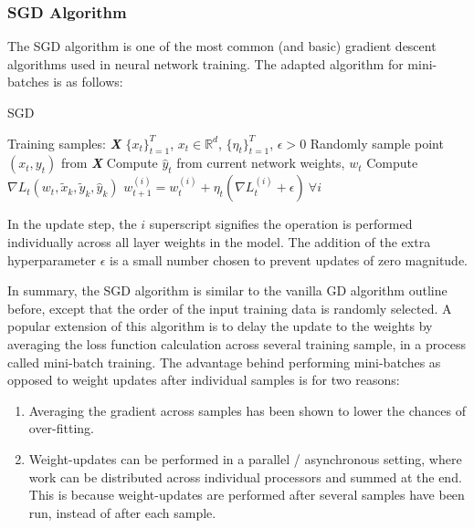 \subsubsection{SGD Algorithm}
The SGD algorithm is one of the most common (and basic) gradient descent algorithms used in neural network training. The adapted algorithm for mini-batches is as follows:
\vspace{14pt}
\begin{minipage}[b]{.48\textwidth}
\begin{algorithm}[H]\small
	\caption{SGD \cite{SGD}}
	\label{alg:SGD}
	\begin{algorithmic}
		 Training samples: \textbf{\textit{X}} \subset $\{x_t\}_{t=1}^T$, $x_t \in \mathbb{R}^d$, $\{\eta_t\}_{t=1}^T$, $\epsilon>0$
		\vspace{4pt}
		    \vspace{3pt}
		    \STATE Randomly sample point $(x_t,y_t)$ from \textbf{\textit{X}}
		    \vspace{3pt}
		    \STATE Compute $\hat y_t$ from current network weights, $w_t$
		    \vspace{3pt}
		    \STATE Compute $\nabla L_t(w_t,\tilde x_{k},\tilde y_k,\hat y_k)$
		    \vspace{3pt}
		    \STATE $w_{t+1}^{(i)} = w_{t}^{(i)} + \eta_t (\nabla L_{t}^{(i)} + \epsilon) \: \forall  i$
		\vspace{3pt}
		\ENDFOR
	\end{algorithmic}
\end{algorithm}
\end{minipage}\hfill
\vspace{-8pt}
In the update step, the $i$ superscript signifies the operation is performed individually across all layer weights in the model. The addition of the extra hyperparameter $\epsilon$ is a small number chosen to prevent updates of zero magnitude.

In summary, the SGD algorithm is similar to the vanilla GD algorithm outline before, except that the order of the input training data is randomly selected. A popular extension of this algorithm is to delay the update to the weights by averaging the loss function calculation across several training sample, in a process called mini-batch training. The advantage behind performing mini-batches as opposed to weight updates after individual samples is for two reasons:
\vspace{4pt}
\begin{enumerate}
    \item Averaging the gradient across samples has been shown to lower the chances of over-fitting. \cite{Masters2018RevisitingSB}
    \item Weight-updates can be performed in a parallel / asynchronous setting, where work can be distributed across individual processors and summed at the end. This is because weight-updates are performed after several samples have been run, instead of after each sample.
\end{enumerate}
\vspace{3pt}

